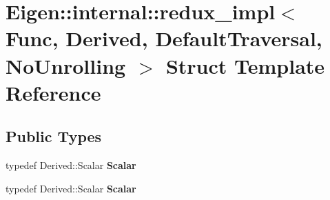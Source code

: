 \hypertarget{struct_eigen_1_1internal_1_1redux__impl_3_01_func_00_01_derived_00_01_default_traversal_00_01_no_unrolling_01_4}{}\section{Eigen\+:\+:internal\+:\+:redux\+\_\+impl$<$ Func, Derived, Default\+Traversal, No\+Unrolling $>$ Struct Template Reference}
\label{struct_eigen_1_1internal_1_1redux__impl_3_01_func_00_01_derived_00_01_default_traversal_00_01_no_unrolling_01_4}
\subsection*{Public Types}
\begin{DoxyCompactItemize}
\item 
\mbox{\label{struct_eigen_1_1internal_1_1redux__impl_3_01_func_00_01_derived_00_01_default_traversal_00_01_no_unrolling_01_4_afaa145437cd5078e52e269b05271619e}} 
typedef Derived\+::\+Scalar {\bfseries Scalar}
\item 
\mbox{\label{struct_eigen_1_1internal_1_1redux__impl_3_01_func_00_01_derived_00_01_default_traversal_00_01_no_unrolling_01_4_afaa145437cd5078e52e269b05271619e}} 
typedef Derived\+::\+Scalar {\bfseries Scalar}
\end{DoxyCompactItemize}
